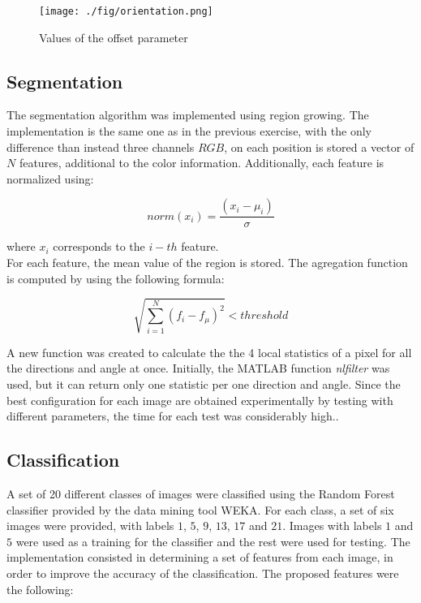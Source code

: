 \documentclass{IEEEtran}
\begin{document}
\begin{figure}[h!] 
 \centering
 \texttt{[image: ./fig/orientation.png]}%
 \caption{Values of the offset parameter \cite{matlab}}
 \label{fig:offset}
\end{figure}

\subsection{Segmentation}


The segmentation algorithm was implemented using region growing. The implementation is the same one as in the previous exercise, with the only difference than instead three channels $RGB$, on each position is stored a vector of $N$ features, additional to the color information. Additionally, each feature is normalized using:

\begin{equation}
norm(x_i) = \frac{(x_i - {\mu}_i)}{\sigma} 
\end{equation}

where $x_i$ corresponds to the $i-th$ feature.\\

For each feature, the mean value of the region is stored. The agregation
function is computed by using the following formula:

\begin{equation}
\sqrt{\sum_{i=1}^{N} (f_i - f_{\mu})^2} < threshold
\end{equation}

A new function was created to calculate the the 4 local statistics
of a pixel for all the directions and angle at once. 
Initially, the MATLAB function \textit{nlfilter}
was used, but it can return only one statistic per       
one direction and angle. Since the best configuration for
each image are obtained experimentally by testing with
different parameters, the time for each test was considerably
high..

\subsection{Classification}

A set of 20 different classes of images were classified using the Random Forest classifier provided by the data mining tool WEKA. For each class, a set of six images were provided, with labels $1$, $5$, $9$, $13$, $17$ and $21$. Images with labels $1$ and $5$ were used as a training for the classifier and the rest were used for testing. The implementation consisted in determining a set of features from each image, in order to improve the accuracy of the classification. The proposed features were the following:
\end{document}
